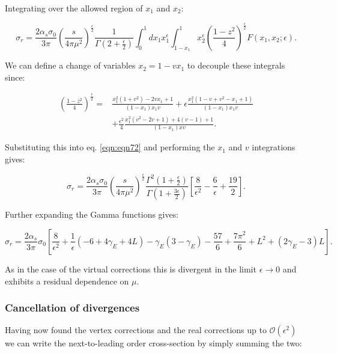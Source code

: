			Integrating over the allowed region of $x_1$ and $x_2$:

			\begin{equation}
				\sigma_r = \frac{2\alpha_s\sigma_0}{3\pi}\left(\frac{s}{4\pi\mu^2}\right)^{\frac{\epsilon}{2}}\frac{1}{\Gamma(2+\frac{\epsilon}{2})}
				\int_0^1dx_1x_1^\epsilon\int^1_{1-x_1}x_2^\epsilon\left(\frac{1-z^2}{4}\right)^{\frac{\epsilon}{2}}F(x_1, x_2;\epsilon).
				\label{eqn:eqn72}
			\end{equation}

			We can define a change of variables $x_2=1-vx_1$ to decouple these integrals since:

			\begin{align}
				\left(\frac{1-z^2}{4}\right)^{\frac{\epsilon}{2}} = &\frac{x_1^2(1+v^2)-2vx_1+1}{(1-x_1)x_1v} + \epsilon\frac{x_1^2(1-v+v^2-x_1+1)}
				{(1-x_1)x_1v} \\&+\frac{\epsilon^2}{4}\frac{x_1^2(v^2-2v+1) + 4(v-1) + 1}{(1-x_1)xv}.
			\end{align}

			Substituting this into eq. \eqref{eqn:eqn72} and performing the $x_1$ and $v$ integrations gives:

			\begin{equation}
				\sigma_r = \frac{2\alpha_s\sigma_0}{3\pi}\left(\frac{s}{4\pi\mu^2}\right)^{\frac{\epsilon}{2}}\frac{\Gamma^2
				\left(1+\frac{\epsilon}{2}\right)}{\Gamma\left(1+\frac{3\epsilon}{2}\right)}\left[\frac{8}{\epsilon^2} - \frac{6}{\epsilon} + \frac{19}{2}\right].
			\end{equation}

			Further expanding the Gamma functions gives:

			\begin{equation*}
				\sigma_r = \frac{2\alpha_s}{3\pi}\sigma_0\left[\frac{8}{\epsilon^2} + \frac{1}{\epsilon}\left(-6+4\gamma_E+4L\right)-
				\gamma_E(3-\gamma_E)-\frac{57}{6}+\frac{7\pi^2}{6}+L^2+(2\gamma_E-3)L\right].
			\end{equation*}

			As in the case of the virtual corrections this is divergent in the limit $\epsilon\rightarrow0$ and exhibits a residual
			dependence on $\mu$.

		\subsubsection{Cancellation of divergences}

			Having now found the vertex corrections and the real corrections up to $\mathcal{O}(\epsilon^2)$
			we can write the next-to-leading order cross-section by simply summing the two:

